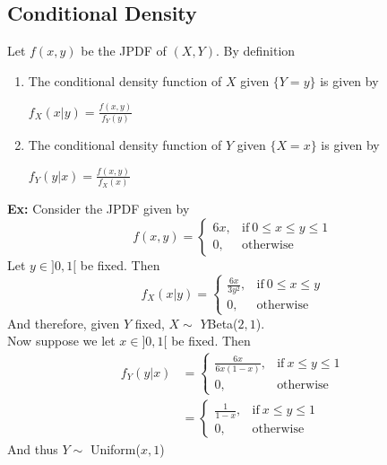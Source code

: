 \documentclass{article}
\newcommand{\exx}{\textbf{Ex: }}
\begin{document}
\subsection{Conditional Density}
Let $f(x, y)$ be the JPDF of $(X, Y)$. By definition
\begin{enumerate}
	\item The conditional density function of $X$ given $\{Y=y\}$ is given by \begin{center}$\displaystyle f_{X}(x|y) = \frac{f(x, y)}{f_{Y}(y)}$\end{center}
	\item The conditional density function of $Y$ given $\{X=x\}$ is given by \begin{center}$\displaystyle f_{Y}(y|x) = \frac{f(x, y)}{f_{X}(x)}$\end{center}
\end{enumerate}
\exx Consider the JPDF given by
\[
f(x, y) =
\begin{cases}
	6x, &\text{if}\ 0 \leq x \leq y \leq 1\\
	0, &\text{otherwise}
\end{cases}
\]
Let $y \in ]0, 1[$ be fixed. Then
\[
f_{X}(x|y) =
\begin{cases}
	\frac{6x}{3y^{2}}, &\text{if}\ 0 \leq x \leq y\\
	0, &\text{otherwise}
\end{cases}
\]
And therefore, given $Y$ fixed, $X \sim$ $Y$Beta($2, 1$).\\
Now suppose we let $x \in ]0, 1[$ be fixed. Then
\begin{align*}
f_{Y}(y|x) &=
\begin{cases}
	\frac{6x}{6x(1-x)}, &\text{if}\ x \leq y \leq 1\\
	0, &\text{otherwise}
\end{cases}\\
	&= 
\begin{cases}
	\frac{1}{1-x}, &\text{if}\ x \leq y \leq 1\\
	0, &\text{otherwise}
\end{cases}
\end{align*}
And thus $Y \sim$ Uniform($x, 1$)
\end{document}
